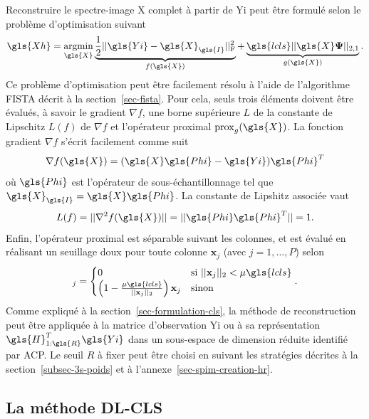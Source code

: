 Reconstruire le spectre-image \gls{X} complet à partir de \gls{Yi} peut être formulé selon le problème d'optimisation suivant
\begin{equation}
\gls{Xh}=\argmin_{\gls{X}} 
    \underbrace{\frac{1}{2} \frobnorm{\gls{Yi} - \gls{X}_{\gls{I}}}}_{f(\gls{X})} +
    \underbrace{ \gls{lcls} ||\gls{X}\boldsymbol\Psi||_{2, 1}}_{g(\gls{X})}.
\end{equation}
Ce problème d'optimisation peut être facilement résolu à l'aide de l'algorithme FISTA décrit à la section~\ref{sec-fista}. Pour cela, seuls trois éléments doivent être évalués, à savoir le gradient $\nabla f$, une borne supérieure $L$ de la constante de Lipschitz $L(f)$ de $\nabla f$ et l'opérateur proximal  $\mathrm{prox}_{g}(\gls{X})$. La fonction gradient $\nabla f$ s'écrit facilement comme suit
\begin{equation}
    \nabla f(\gls{X}) = (\gls{X}\gls{Phi} - \gls{Yi})\gls{Phi}^T
\end{equation}
où $\gls{Phi}$ est l'opérateur de sous-échantillonnage tel que $\gls{X}_{\gls{I}} = \gls{X}\gls{Phi}$. La constante de Lipshitz associée vaut
\begin{equation}
    L(f) = ||\nabla^2 f(\gls{X})|| = ||\gls{Phi}\gls{Phi}^T|| = 1.
\end{equation}
Enfin, l'opérateur proximal est séparable suivant les colonnes, et est évalué en réalisant un seuillage doux pour toute colonne $\mathbf{x}_j$ (avec $j=1, \dots, P$) selon~\cite{jenatton2011proximal}
\begin{equation}
[\mathrm{prox}_{\mu g}(\gls{X})]_j = 
\begin{cases}
0&\text{si}\ ||\mathbf{x}_j||_2 < \mu \gls{lcls}\\
\left(1-\frac{\mu\gls{lcls}}{||\mathbf{x}_j||_2}\right)\mathbf{x}_j&\text{sinon}\\
\end{cases}.\label{eq-prox-op}
\end{equation}
Comme expliqué à la section~\ref{sec-formulation-cls}, la méthode de reconstruction peut être appliquée à la matrice d'observation \gls{Yi} ou à sa représentation $\gls{H}_{1:\gls{R}}^T\gls{Yi}$ dans un sous-espace de dimension réduite identifié par ACP. Le seuil $R$ à fixer peut être choisi en suivant les stratégies décrites à la section~\ref{subsec-3s-poids} et à l'annexe~\ref{sec-spim-creation-hr}.



\subsection{La méthode DL-CLS}

